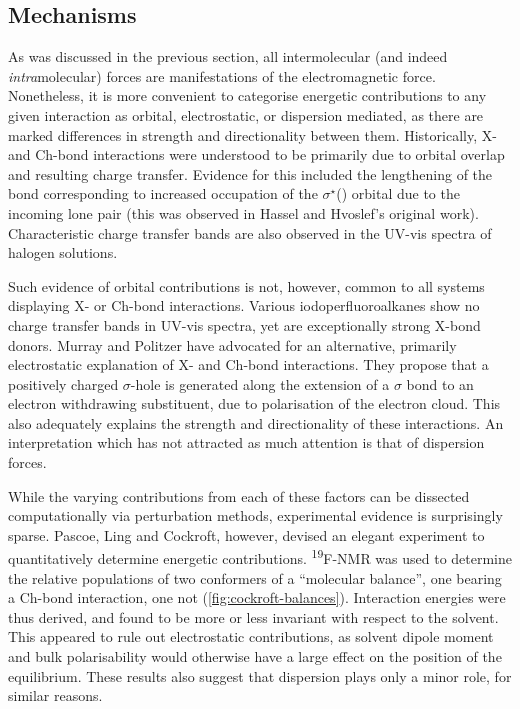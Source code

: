 \begin{refsection}
\subsection{Mechanisms}
As was discussed in the previous section, all intermolecular (and indeed \emph{intra}mole\-cular) forces are manifestations of the electromagnetic force.
Nonetheless, it is more convenient to categorise energetic contributions to any given interaction as orbital, electrostatic, or dispersion mediated, as there are marked differences in strength and directionality between them.
Historically, X- and Ch-bond interactions were understood to be primarily due to orbital overlap and resulting charge transfer.
Evidence for this included the lengthening of the  bond corresponding to increased occupation of the $\sigma^{\star}$() orbital due to the incoming lone pair (this was observed in Hassel and Hvoslef's original work\autocite{Hassel1954}).
Characteristic charge transfer bands are also observed in the UV-vis spectra of halogen solutions.\autocite{Blackstock1987}

Such evidence of orbital contributions is not, however, common to all systems displaying X- or Ch-bond interactions.
Various iodoperfluoroalkanes show no charge transfer bands in UV-vis spectra, yet are exceptionally strong X-bond donors.\autocite{Amico1998,Yan2014,Cabot2009,Sarwar2010}
Murray and Politzer have advocated for an alternative, primarily electrostatic explanation of X- and Ch-bond interactions.\autocite{Murray2008,Murray2009}
They propose that a positively charged $ \sigma $-hole is generated along the extension of a $ \sigma $ bond to an electron withdrawing substituent, due to polarisation of the electron cloud.
This also adequately explains the strength and directionality of these interactions.
An interpretation which has not attracted as much attention is that of dispersion forces.

While the varying contributions from each of these factors can be dissected computationally via perturbation methods, experimental evidence is surprisingly sparse.
Pascoe, Ling and Cockroft, however, devised an elegant experiment to quantitatively determine energetic contributions.\autocite{Pascoe2017}
\textsuperscript{19}F-NMR was used to determine the relative populations of two conformers of a ``molecular balance'', one bearing a Ch-bond interaction, one not (\cref{fig:cockroft-balances}).
Interaction energies were thus derived, and found to be more or less invariant with respect to the solvent.
This appeared to rule out electrostatic contributions, as solvent dipole moment and bulk polarisability would otherwise have a large effect on the position of the equilibrium.
These results also suggest that dispersion plays only a minor role, for similar reasons.


\end{refsection}
